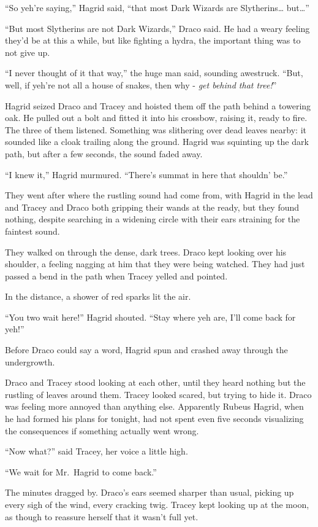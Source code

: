 ``So yeh're saying,'' Hagrid said, ``that most Dark Wizards are
Slytherins\ldots{} but\ldots{}''

``But most Slytherins are not Dark Wizards,'' Draco said. He had a weary
feeling they'd be at this a while, but like fighting a hydra, the
important thing was to not give up.

``I never thought of it that way,'' the huge man said, sounding
awestruck. ``But, well, if yeh're not all a house of snakes, then why -
\emph{get behind that tree!}''

Hagrid seized Draco and Tracey and hoisted them off the path behind a
towering oak. He pulled out a bolt and fitted it into his crossbow,
raising it, ready to fire. The three of them listened. Something was
slithering over dead leaves nearby: it sounded like a cloak trailing
along the ground. Hagrid was squinting up the dark path, but after a few
seconds, the sound faded away.

``I knew it,'' Hagrid murmured. ``There's summat in here that shouldn'
be.''

They went after where the rustling sound had come from, with Hagrid in
the lead and Tracey and Draco both gripping their wands at the ready,
but they found nothing, despite searching in a widening circle with
their ears straining for the faintest sound.

They walked on through the dense, dark trees. Draco kept looking over
his shoulder, a feeling nagging at him that they were being watched.
They had just passed a bend in the path when Tracey yelled and pointed.

In the distance, a shower of red sparks lit the air.

``You two wait here!'' Hagrid shouted. ``Stay where yeh are, I'll come
back for yeh!''

Before Draco could say a word, Hagrid spun and crashed away through the
undergrowth.

Draco and Tracey stood looking at each other, until they heard nothing
but the rustling of leaves around them. Tracey looked scared, but trying
to hide it. Draco was feeling more annoyed than anything else.
Apparently Rubeus Hagrid, when he had formed his plans for tonight, had
not spent even five seconds visualizing the consequences if something
actually went wrong.

``Now what?'' said Tracey, her voice a little high.

``We wait for Mr.~Hagrid to come back.''

The minutes dragged by. Draco's ears seemed sharper than usual, picking
up every sigh of the wind, every cracking twig. Tracey kept looking up
at the moon, as though to reassure herself that it wasn't full yet.

